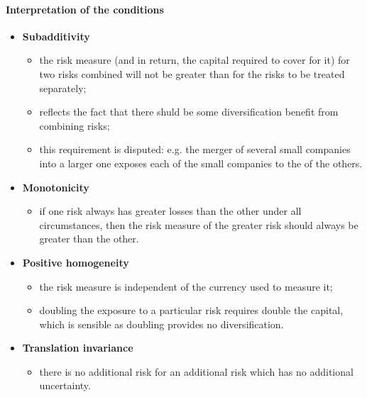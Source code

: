 \documentclass[notoc,notitlepage]{tufte-book}
\begin{document}
\paragraph{Interpretation of the conditions}

\begin{itemize}
  \item \textbf{Subadditivity}
    \begin{itemize}
      \item the risk measure (and in return, the capital required to cover for it) for two risks combined will not be greater than for the risks to be treated separately;
      \item reflects the fact that there shuld be some diversification benefit from combining risks;
      \item this requirement is disputed: e.g. the merger of several small companies into a larger one exposes each of the small companies to the  of the others.
    \end{itemize}

  \item \textbf{Monotonicity}
    \begin{itemize}
      \item if one risk always has greater losses than the other under all circumstances, then the risk measure of the greater risk should always be greater than the other.
    \end{itemize}

  \item \textbf{Positive homogeneity}
    \begin{itemize}
      \item the risk measure is independent of the currency used to measure it;
      \item doubling the exposure to a particular risk requires double the capital, which is sensible as doubling provides no diversification.
    \end{itemize}

  \item \textbf{Translation invariance}
    \begin{itemize}
      \item there is no additional risk for an additional risk which has no additional uncertainty.
    \end{itemize}
\end{itemize}



\backmatter

\pagestyle{plain}

\nobibliography*




\printindex
\end{document}
